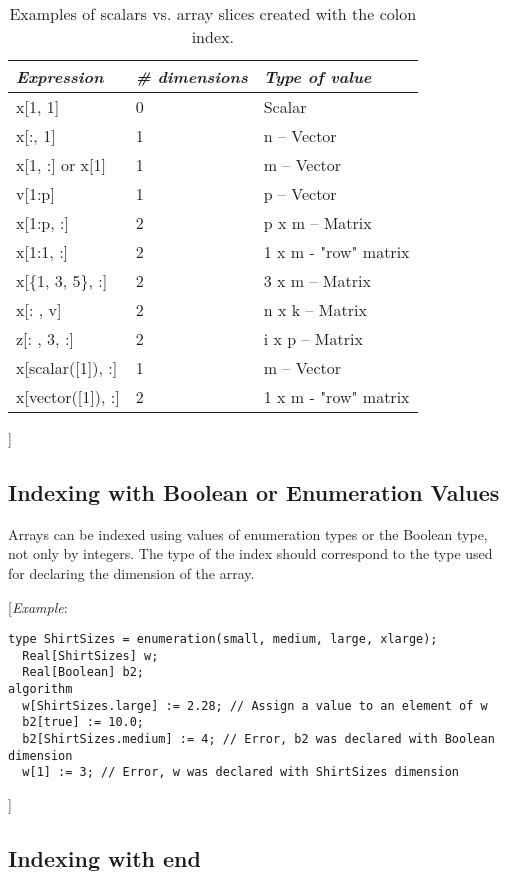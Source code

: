 \begin{longtable}[]{|l|l|l|}
\caption{Examples of scalars vs. array slices created with the colon index.}\\
\hline
\emph{Expression} & \emph{\# dimensions} & \emph{Type of value}\\ \hline
\endhead
x{[}1, 1{]} & 0 & Scalar\\ \hline
x{[}:, 1{]} & 1 & n -- Vector\\ \hline
x{[}1, :{]} or x{[}1{]} & 1 & m -- Vector\\ \hline
v{[}1:p{]} & 1 & p -- Vector\\ \hline
x{[}1:p, :{]} & 2 & p x m -- Matrix\\ \hline
x{[}1:1, :{]} & 2 & 1 x m - "row" matrix\\ \hline
x{[}\{1, 3, 5\}, :{]} & 2 & 3 x m -- Matrix\\ \hline
x{[}: , v{]} & 2 & n x k -- Matrix\\ \hline
z{[}: , 3, :{]} & 2 & i x p -- Matrix\\ \hline
x{[}scalar({[}1{]}), :{]} & 1 & m -- Vector\\ \hline
x{[}vector({[}1{]}), :{]} & 2 & 1 x m - "row" matrix\\ \hline

\end{longtable}

{]}

\subsection{Indexing with Boolean or Enumeration Values}

Arrays can be indexed using values of enumeration types or the Boolean
type, not only by integers. The type of the index should correspond to
the type used for declaring the dimension of the array.

{[}\emph{Example}:

\begin{lstlisting}[language=modelica]
  type ShirtSizes = enumeration(small, medium, large, xlarge);
  Real[ShirtSizes] w;
  Real[Boolean] b2;
algorithm
  w[ShirtSizes.large] := 2.28; // Assign a value to an element of w
  b2[true] := 10.0;
  b2[ShirtSizes.medium] := 4; // Error, b2 was declared with Boolean dimension
  w[1] := 3; // Error, w was declared with ShirtSizes dimension
\end{lstlisting}
{]}

\subsection{Indexing with end}

